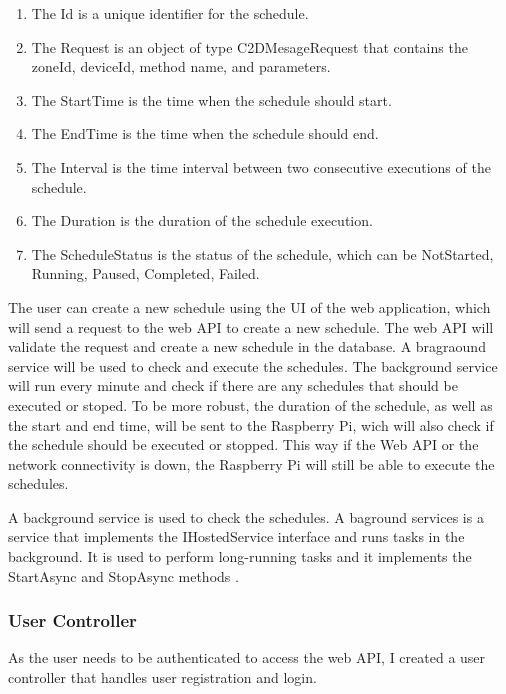 \begin{enumerate}
    \item The Id is a unique identifier for the schedule.
    \item The Request is an object of type C2DMesageRequest that contains the zoneId, deviceId, method name, and parameters.
    \item The StartTime is the time when the schedule should start.
    \item The EndTime is the time when the schedule should end.
    \item The Interval is the time interval between two consecutive executions of the schedule.
    \item The Duration is the duration of the schedule execution.
    \item The ScheduleStatus is the status of the schedule, which can be NotStarted, Running, Paused, Completed, Failed.
\end{enumerate}

The user can create a new schedule using the UI of the web application,
which will send a request to the web API to create a new schedule. 
The web API will validate the request and create a new schedule in the database.
A bragraound service will be used to check and execute the schedules. The background service will run 
every minute and check if there are any schedules that should be executed or stoped. To be more robust, the duration 
of the schedule, as well as the start and end time, will be sent to the Raspberry Pi, wich will also check if 
the schedule should be executed or stopped. This way if the Web API or the network connectivity is down, 
the Raspberry Pi will still be able to execute the schedules.

A background service is used to check the schedules. A baground services is a service that implements
the IHostedService interface and runs tasks in the background. It is used to perform long-running tasks and
it implements the StartAsync and StopAsync methods \cite{IHostedService}.


\subsubsection{User Controller}
As the user needs to be authenticated to access the web API,
I created a user controller that handles user registration and login.

